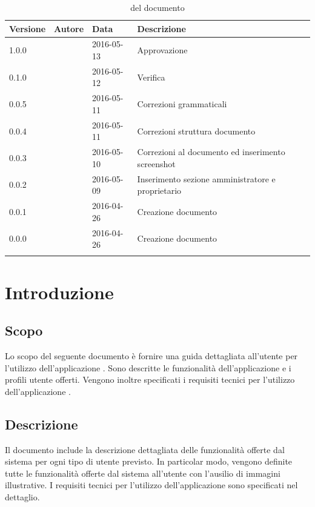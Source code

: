 \documentclass[12pt,a4paper]{article}
\begin{document}
	\begin{center}
		\begin{longtable}[H]{p{} p{} p{} p{}}
			\toprule
			\textbf{Versione}	&	\textbf{Autore}	&	\textbf{Data}	&	\textbf{Descrizione}\\*
			\midrule
			1.0.0 & \AVE{} & 2016-05-13 &  Approvazione \\*			
			\midrule
			0.1.0 & \TP{} & 2016-05-12 &  Verifica \\*
			\midrule
			0.0.5 & \WS{} & 2016-05-11 &  Correzioni grammaticali \\*
			\midrule
			0.0.4 & \WS{} & 2016-05-11 &  Correzioni struttura documento \\*
			\midrule
			0.0.3 & \WS{} & 2016-05-10 &  Correzioni al documento ed inserimento screenshot \\*
			\midrule
			0.0.2 & \WS{} & 2016-05-09 &  Inserimento sezione amministratore e proprietario \\*
			\midrule
			0.0.1 & \AB{} & 2016-04-26 &  Creazione documento \\*
			\midrule
			0.0.0 & \AB{} & 2016-04-26 &  Creazione documento \\*
			\bottomrule
			\caption{\mGls{versionamento}  del documento}
			\label{tabVers1}
		\end{longtable}
	\end{center}
	
	\newpage
	\tableofcontents
	\newpage
	\listoftables
	\listoffigures
	\newpage
	
	
	\section{Introduzione}	\label{intro}
	
	\subsection{Scopo}
	Lo scopo del seguente documento è fornire una guida dettagliata all’utente per l’utilizzo dell’applicazione \prj{}. Sono descritte le funzionalità dell'applicazione e i profili utente offerti.
	Vengono inoltre specificati i requisiti tecnici per l'utilizzo dell'applicazione \prj{}.

	\subsection{Descrizione}
    Il documento include la descrizione dettagliata delle funzionalità offerte dal sistema per ogni tipo di utente previsto. In particolar modo, vengono definite tutte le funzionalità offerte dal sistema all’utente con l’ausilio di immagini illustrative. 
    I requisiti tecnici per l'utilizzo dell'applicazione \prj{} sono specificati nel dettaglio.
	
\end{document}
